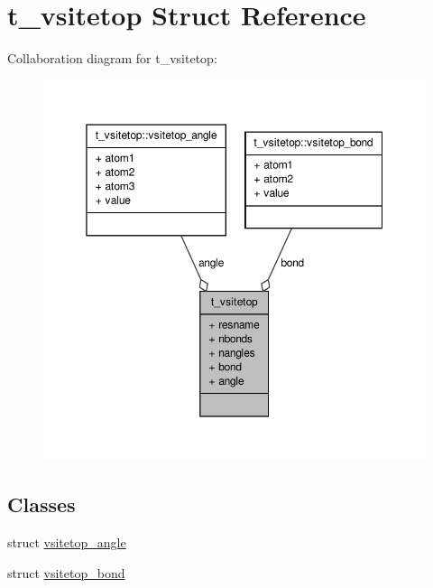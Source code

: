 \hypertarget{structt__vsitetop}{\section{t\-\_\-vsitetop \-Struct \-Reference}
\label{structt__vsitetop}
}


\-Collaboration diagram for t\-\_\-vsitetop\-:
\nopagebreak
\begin{figure}[H]
\begin{center}
\leavevmode
\includegraphics[width=350pt]{structt__vsitetop__coll__graph}
\end{center}
\end{figure}
\subsection*{\-Classes}
\begin{DoxyCompactItemize}
\item 
struct \hyperlink{structt__vsitetop_1_1vsitetop__angle}{vsitetop\-\_\-angle}
\item 
struct \hyperlink{structt__vsitetop_1_1vsitetop__bond}{vsitetop\-\_\-bond}
\end{DoxyCompactItemize}

